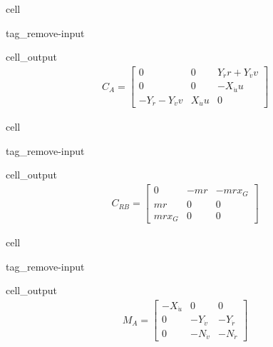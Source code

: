 \documentclass[review]{elsarticle}
\begin{document}
\begin{sphinxuseclass}{cell}
\begin{sphinxuseclass}{tag_remove-input}
\begin{sphinxuseclass}{cell_output}\begin{equation*}
\begin{split}\displaystyle C_{A} = \left[\begin{matrix}0 & 0 & Y_{\dot{r}} r + Y_{\dot{v}} v\\0 & 0 & - X_{\dot{u}} u\\- Y_{\dot{r}} - Y_{\dot{v}} v & X_{\dot{u}} u & 0\end{matrix}\right]\end{split}
\end{equation*}
\end{sphinxuseclass}
\end{sphinxuseclass}
\end{sphinxuseclass}
\begin{sphinxuseclass}{cell}
\begin{sphinxuseclass}{tag_remove-input}
\begin{sphinxuseclass}{cell_output}\begin{equation*}
\begin{split}\displaystyle C_{RB} = \left[\begin{matrix}0 & - m r & - m r x_{G}\\m r & 0 & 0\\m r x_{G} & 0 & 0\end{matrix}\right]\end{split}
\end{equation*}
\end{sphinxuseclass}
\end{sphinxuseclass}
\end{sphinxuseclass}
\begin{sphinxuseclass}{cell}
\begin{sphinxuseclass}{tag_remove-input}
\begin{sphinxuseclass}{cell_output}\begin{equation*}
\begin{split}\displaystyle M_{A} = \left[\begin{matrix}- X_{\dot{u}} & 0 & 0\\0 & - Y_{\dot{v}} & - Y_{\dot{r}}\\0 & - N_{\dot{v}} & - N_{\dot{r}}\end{matrix}\right]\end{split}
\end{equation*}
\end{sphinxuseclass}
\end{sphinxuseclass}
\end{sphinxuseclass}
\end{document}
